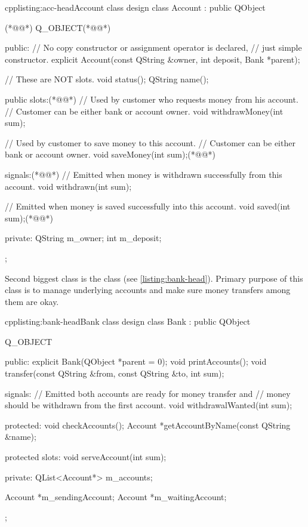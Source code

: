 \begin{fdoccode}{cpp}{listing:acc-head}{Account class design}
class Account : public QObject {(*@\label{listing:qobj1}@*)
	Q_OBJECT(*@\label{listing:qobj2}@*)

    public:
		// No copy constructor or assignment operator is declared,
		// just simple constructor.
		explicit Account(const QString &owner,
						int deposit,
						Bank *parent);

		// These are NOT slots.
		void status();
		QString name();

    public slots:(*@\label{listing:slots1}@*)
		// Used by customer who requests money from his account.
		// Customer can be either bank or account owner.
		void withdrawMoney(int sum);

		// Used by customer to save money to this account.
		// Customer can be either bank or account owner.
		void saveMoney(int sum);(*@\label{listing:slots2}@*)

    signals:(*@\label{listing:signals1}@*)
		// Emitted when money is withdrawn successfully from this account.
		void withdrawn(int sum);

		// Emitted when money is saved successfully into this account.
		void saved(int sum);(*@\label{listing:signals2}@*)

    private:
		QString m_owner;
		int m_deposit;
};
\end{fdoccode}

Second biggest class is the class (see \autoref{listing:bank-head}). Primary purpose of this class is to manage underlying accounts and make sure money transfers among them are okay.

\begin{fdoccode}{cpp}{listing:bank-head}{Bank class design}
class Bank : public QObject {
	Q_OBJECT

    public:
		explicit Bank(QObject *parent = 0);
		void printAccounts();
		void transfer(const QString &from, const QString &to, int sum);

    signals:
		// Emitted both accounts are ready for money transfer and
		// money should be withdrawn from the first account.
		void withdrawalWanted(int sum);

    protected:
		void checkAccounts();
		Account *getAccountByName(const QString &name);

    protected slots:
		void serveAccount(int sum);

	private:
		QList<Account*> m_accounts;

		Account *m_sendingAccount;
		Account *m_waitingAccount;
};
\end{fdoccode}

